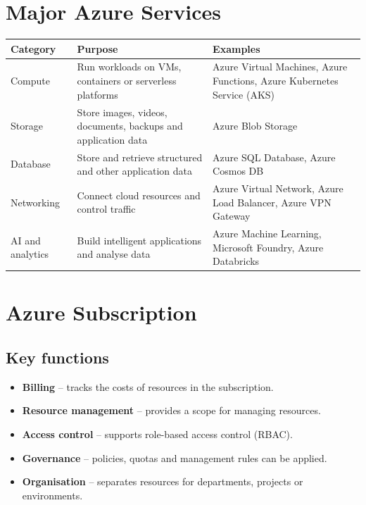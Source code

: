 \documentclass[11pt,a4paper]{article}
\begin{document}
\section{Major Azure Services}

\begin{tabularx}{\textwidth}{@{}lXX@{}}
\toprule
\rowcolor{tablehead}\textbf{Category} & \textbf{Purpose} & \textbf{Examples} \\
\midrule
Compute & Run workloads on VMs, containers or serverless platforms & Azure Virtual Machines,
  Azure Functions, Azure Kubernetes Service (AKS) \\
\addlinespace
Storage & Store images, videos, documents, backups and application data & Azure Blob Storage \\
\addlinespace
Database & Store and retrieve structured and other application data & Azure SQL Database,
  Azure Cosmos DB \\
\addlinespace
Networking & Connect cloud resources and control traffic & Azure Virtual Network, Azure Load
  Balancer, Azure VPN Gateway \\
\addlinespace
AI and analytics & Build intelligent applications and analyse data & Azure Machine Learning,
  Microsoft Foundry, Azure Databricks \\
\bottomrule
\end{tabularx}

\section{Azure Subscription}


\subsection{Key functions}

\begin{itemize}\itemsep2pt
  \item \textbf{Billing} -- tracks the costs of resources in the subscription.
  \item \textbf{Resource management} -- provides a scope for managing resources.
  \item \textbf{Access control} -- supports role-based access control (RBAC).
  \item \textbf{Governance} -- policies, quotas and management rules can be applied.
  \item \textbf{Organisation} -- separates resources for departments, projects or
        environments.
\end{itemize}
\end{document}
